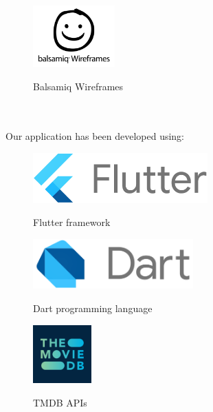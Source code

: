 \documentclass[12pt, a4paper]{article}
\numberwithin{figure}{section}
\begin{document}
\begin{center}
	\begin{figure}[H]
		\centering
		\includegraphics[width=0.28\textwidth]{images/programmiUsati/balsamiq.png}\\
		\caption{Balsamiq Wireframes}
	\end{figure}
\end{center}


\noindent
\mbox{}\\\\
Our application has been developed using:

\begin{center}
	\begin{minipage}{0.45\textwidth}
		\begin{figure}[H]
			\centering
			\includegraphics[width=0.6\textwidth]{images/programmiUsati/flutter.png}\\
			\caption{Flutter framework}
		\end{figure}
	\end{minipage}
	\hspace{0.02\linewidth}
	\begin{minipage}{0.45\textwidth}
		\begin{figure}[H]
			\centering
			\includegraphics[width=0.55\textwidth]{images/programmiUsati/dart.png}\\
			\caption{Dart programming language}
		\end{figure}
	\end{minipage}
\end{center}
\begin{center}
	\begin{figure}[H]
		\centering
		\includegraphics[width=0.2\textwidth]{images/programmiUsati/tmdb.png}\\
		\caption{TMDB APIs}
	\end{figure}
\end{center}
\end{document}
